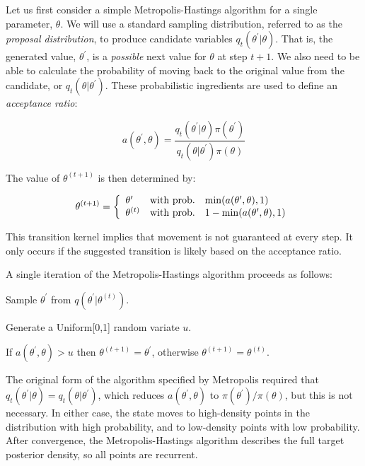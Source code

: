 Let us first consider a simple Metropolis-Hastings algorithm for a single parameter, $\theta$. We will use a standard sampling distribution, referred to as the \emph{proposal distribution}, to produce candidate variables $q_t(\theta^{\prime} | \theta)$. That is, the generated value, $\theta^{\prime}$, is a \emph{possible} next value for $\theta$ at step $t+1$. We also need to be able to calculate the probability of moving back to the original value from the candidate, or $q_t(\theta | \theta^{\prime})$. These probabilistic ingredients are used to define an \emph{acceptance ratio}:

\[
a(\theta^{\prime},\theta) = \frac{q_t(\theta^{\prime} | \theta) \pi(\theta^{\prime})}{q_t(\theta | \theta^{\prime}) \pi(\theta)}
\]

\noindent The value of $\theta^{(t+1)}$ is then determined by:

\[
\theta^{(t+1)} = \left\{\begin{array}{l@{\quad \mbox{with prob.} \quad}l}\theta^{\prime} & \min(a(\theta^{\prime},\theta),1) \\ \theta^{(t)} & 1 - \min(a(\theta^{\prime},\theta),1) \end{array}\right.
\]

\noindent This transition kernel implies that movement is not guaranteed at every step. It only occurs if the suggested transition is likely based on the acceptance ratio.

A single iteration of the Metropolis-Hastings algorithm proceeds as follows:

\begin{list}{}
{}
\item Sample $\theta^{\prime}$ from $q(\theta^{\prime} | \theta^{(t)})$.
\item Generate a Uniform[0,1] random variate $u$.
\item If $a(\theta^{\prime},\theta) > u$ then $\theta^{(t+1)} = \theta^{\prime}$, otherwise $\theta^{(t+1)} = \theta^{(t)}$.
\end{list}

\noindent The original form of the algorithm specified by Metropolis required that $q_t(\theta^{\prime} | \theta) = q_t(\theta | \theta^{\prime})$, which reduces $a(\theta^{\prime},\theta)$ to $\pi(\theta^{\prime})/\pi(\theta)$, but this is not necessary. In either case, the state moves to high-density points in the distribution with high probability, and to low-density points with low probability. After convergence, the Metropolis-Hastings algorithm describes the full target posterior density, so all points are recurrent.

